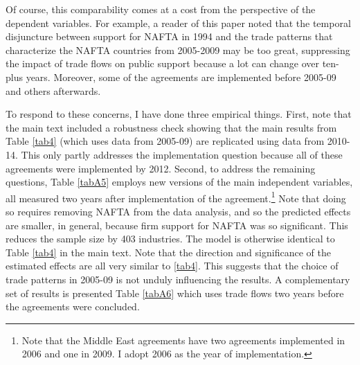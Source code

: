 \documentclass[hidelinks,12pt,letter]{article}
\begin{document}
Of course, this comparability comes at a cost from the perspective of the dependent variables. For example, a reader of this paper noted that the temporal disjuncture between support for NAFTA in 1994 and the trade patterns that characterize the NAFTA countries from 2005-2009 may be too great, suppressing the impact of trade flows on public support because a lot can change over ten-plus years. Moreover, some of the agreements are implemented before 2005-09 and others afterwards.

To respond to these concerns, I have done three empirical things. First, note that the main text included a robustness check showing that the main results from Table \ref{tab4} (which uses data from 2005-09) are replicated using data from 2010-14. This only partly addresses the implementation question because all of these agreements were implemented by 2012. Second, to address the remaining questions, Table \ref{tabA5} employs new versions of the main independent variables, all measured two years after implementation of the agreement.\footnote{Note that the Middle East agreements have two agreements implemented in 2006 and one in 2009. I adopt 2006 as the year of implementation.} Note that doing so requires removing NAFTA from the data analysis, and so the predicted effects are smaller, in general, because firm support for NAFTA was so significant. This reduces the sample size by 403 industries. The model is otherwise identical to Table \ref{tab4} in the main text. Note that the direction and significance of the estimated effects are all very similar to \ref{tab4}. This suggests that the choice of trade patterns in 2005-09 is not unduly influencing the results. A complementary set of results is presented Table \ref{tabA6} which uses trade flows two years before the agreements were concluded. 
\end{document}
